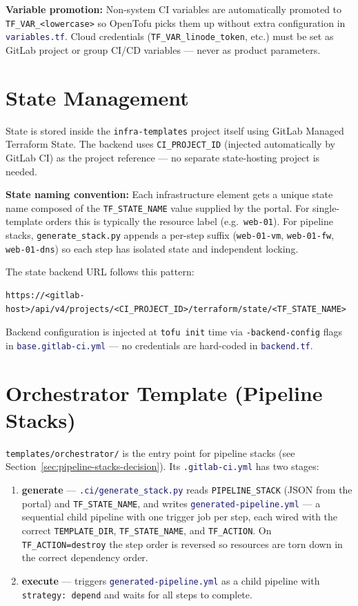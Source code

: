 \documentclass[12pt,a4paper,twoside]{report}
\newcommand{\code}[1]{\texttt{#1}}
\newcommand{\file}[1]{\texttt{\textcolor{MidnightBlue}{#1}}}
\begin{document}
\textbf{Variable promotion:} Non-system CI variables are automatically
promoted to \code{TF\_VAR\_<lowercase>} so OpenTofu picks them up
without extra configuration in \file{variables.tf}. Cloud credentials
(\code{TF\_VAR\_linode\_token}, etc.) must be set as GitLab project or
group CI/CD variables — never as product parameters.

\section{State Management}

State is stored inside the \code{infra-templates} project itself using
GitLab Managed Terraform State. The backend uses \code{CI\_PROJECT\_ID}
(injected automatically by GitLab CI) as the project reference — no
separate state-hosting project is needed.

\textbf{State naming convention:} Each infrastructure element gets a
unique state name composed of the \code{TF\_STATE\_NAME} value supplied
by the portal. For single-template orders this is typically the
resource label (e.g.\ \code{web-01}). For pipeline stacks,
\code{generate\_stack.py} appends a per-step suffix
(\code{web-01-vm}, \code{web-01-fw}, \code{web-01-dns}) so each step
has isolated state and independent locking.

The state backend URL follows this pattern:
\begin{lstlisting}[style=bash]
https://<gitlab-host>/api/v4/projects/<CI_PROJECT_ID>/terraform/state/<TF_STATE_NAME>
\end{lstlisting}

Backend configuration is injected at \code{tofu init} time via
\code{-backend-config} flags in \file{base.gitlab-ci.yml} — no
credentials are hard-coded in \file{backend.tf}.

\section{Orchestrator Template (Pipeline Stacks)}

\code{templates/orchestrator/} is the entry point for pipeline stacks
(see Section~\ref{sec:pipeline-stacks-decision}). Its
\file{.gitlab-ci.yml} has two stages:

\begin{enumerate}
  \item \textbf{generate} — \file{.ci/generate\_stack.py} reads
        \code{PIPELINE\_STACK} (JSON from the portal) and
        \code{TF\_STATE\_NAME}, and writes \file{generated-pipeline.yml}
        — a sequential child pipeline with one trigger job per step,
        each wired with the correct \code{TEMPLATE\_DIR},
        \code{TF\_STATE\_NAME}, and \code{TF\_ACTION}.
        On \code{TF\_ACTION=destroy} the step order is reversed so
        resources are torn down in the correct dependency order.
  \item \textbf{execute} — triggers \file{generated-pipeline.yml} as a
        child pipeline with \code{strategy: depend} and waits for all
        steps to complete.
\end{enumerate}
\end{document}
